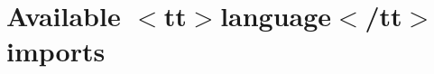 \chapter{Available \texorpdfstring{$<$}{<}tt\texorpdfstring{$>$}{>}language\texorpdfstring{$<$}{<}/tt\texorpdfstring{$>$}{>} imports}
\hypertarget{md_node__modules_2react-syntax-highlighter_2_a_v_a_i_l_a_b_l_e___l_a_n_g_u_a_g_e_s___h_l_j_s}{}\label{md_node__modules_2react-syntax-highlighter_2_a_v_a_i_l_a_b_l_e___l_a_n_g_u_a_g_e_s___h_l_j_s}
\label{md_node__modules_2react-syntax-highlighter_2_a_v_a_i_l_a_b_l_e___l_a_n_g_u_a_g_e_s___h_l_j_s_autotoc_md27166}%
%



